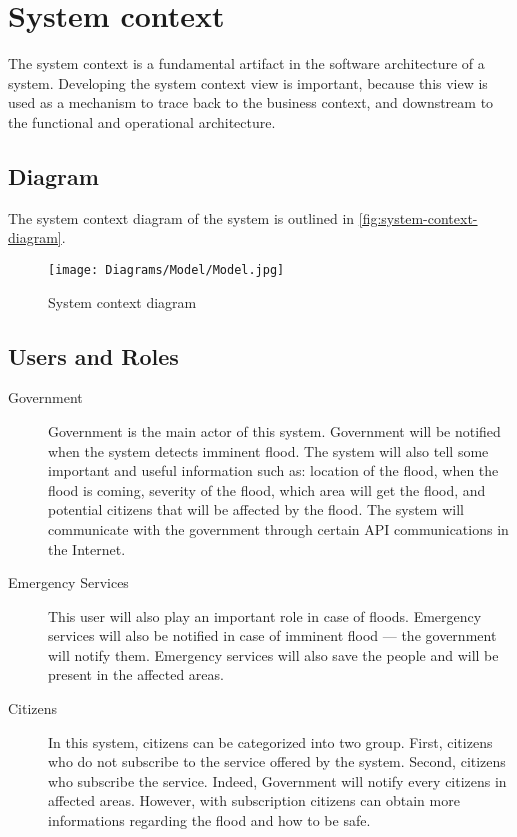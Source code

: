 \section{System context}
The system context is a fundamental artifact in the software architecture of a system. Developing the system context view is important, because this view is used as a mechanism to trace back to the business context, and downstream to the functional and operational architecture.

\subsection{Diagram}
The system context diagram of the system is outlined in \autoref{fig:system-context-diagram}.

\begin{figure}[H]
\centering
\texttt{[image: Diagrams/Model/Model.jpg]}
\caption{System context diagram}
\label{fig:system-context-diagram}
\end{figure}

\subsection{Users and Roles}
\begin{description}
	\item[Government] Government is the main actor of this system. Government will be notified when the system detects imminent flood. The system will also tell some important and useful information such as: location of the flood, when the flood is coming, severity of the flood, which area will get the flood, and potential citizens that will be affected by the flood. The system will communicate with the government through certain API communications in the Internet.
	\item[Emergency Services] This user will also play an important role in case of floods. Emergency services will also be notified in case of imminent flood --- the government will notify them. Emergency services will also save the people and will be present in the affected areas.
	\item[Citizens] In this system, citizens can be categorized into two group. First, citizens who do not subscribe to the service offered by the system. Second, citizens who subscribe the service. Indeed, Government will notify every citizens in affected areas. However, with subscription citizens can obtain more informations regarding the flood and how to be safe.
\end{description} 

